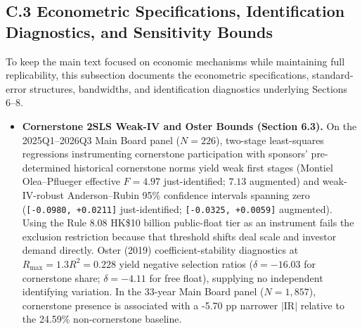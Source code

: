 \documentclass[11pt,letterpaper]{article}
\begin{document}
\subsection*{\texorpdfstring{C.3 Econometric Specifications, Identification Diagnostics, and Sensitivity Bounds}{C.3 Econometric Specifications, Identification Diagnostics, and Sensitivity Bounds}}
To keep the main text focused on economic mechanisms while maintaining full replicability, this subsection documents the econometric specifications, standard-error structures, bandwidths, and identification diagnostics underlying Sections 6–8.

\begin{itemize}
\item \textbf{Cornerstone 2SLS Weak-IV and Oster Bounds (Section 6.3).} On the 2025Q1–2026Q3 Main Board panel ($N = 226$), two-stage least-squares regressions instrumenting cornerstone participation with sponsors' pre-determined historical cornerstone norms yield weak first stages (Montiel Olea–Pflueger effective $F = 4.97$ just-identified; $7.13$ augmented) and weak-IV-robust Anderson–Rubin 95\% confidence intervals spanning zero (\texttt{\small [-0.0980, +0.0211]} just-identified; \texttt{\small [-0.0325, +0.0059]} augmented). Using the Rule 8.08 HK\$10 billion public-float tier as an instrument fails the exclusion restriction because that threshold shifts deal scale and investor demand directly. Oster (2019) coefficient-stability diagnostics at $R_{\max} = 1.3 R^2 = 0.228$ yield negative selection ratios ($\delta = -16.03$ for cornerstone share; $\delta = -4.11$ for free float), supplying no independent identifying variation. In the 33-year Main Board panel ($N = 1,857$), cornerstone presence is associated with a -5.70 pp narrower $|\text{IR}|$ relative to the 24.59\% non-cornerstone baseline.

\end{itemize}
\end{document}

